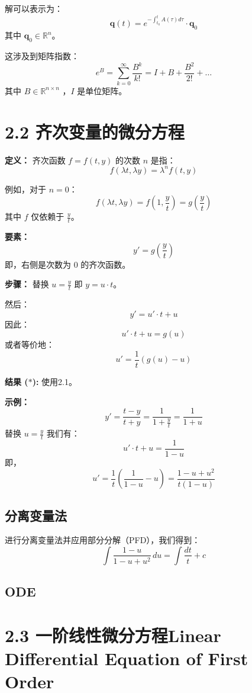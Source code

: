 \documentclass{ctexart}
\begin{document}
解可以表示为：
\[ \mathbf{q}(t) = e^{-\int_{t_0}^{t} A(\tau) d\tau} \cdot \mathbf{q}_0 \]
其中 \( \mathbf{q}_0 \in \mathbb{R}^n \)。

这涉及到矩阵指数：
\[ e^B = \sum_{k=0}^{\infty} \frac{B^k}{k!} = I + B + \frac{B^2}{2!} + \ldots \]
其中 \( B \in \mathbb{R}^{n \times n} \) ，\( I \) 是单位矩阵。


\section*{2.2 齐次变量的微分方程}

\textbf{定义：} 齐次函数 \( f = f(t,y) \) 的次数 \( n \) 是指：
\[ f(\lambda t, \lambda y) = \lambda^n f(t,y) \]

例如，对于 \( n = 0 \)：
\[ f(\lambda t, \lambda y) = f(1, \frac{y}{t}) = g(\frac{y}{t}) \]
其中 \( f \) 仅依赖于 \( \frac{y}{t} \)。

\textbf{要素：}
\[ y' = g\left(\frac{y}{t}\right) \]
即，右侧是次数为 0 的齐次函数。

\textbf{步骤：}
替换 \( u = \frac{y}{t} \) 即 \( y = u \cdot t \)。

然后：
\[ y' = u' \cdot t + u \]
因此：
\[ u' \cdot t + u = g(u) \]
或者等价地：
\[ u' = \frac{1}{t} (g(u) - u) \tag{*} \]

\textbf{结果 (\(*\)):} 使用2.1。

\textbf{示例：}
\[ y' = \frac{t - y}{t + y} = \frac{1}{1 + \frac{y}{t}} = \frac{1}{1 + u} \]
替换 \( u = \frac{y}{t} \) 我们有：
\[ u' \cdot t + u = \frac{1}{1 - u} \]
即，
\[ u' = \frac{1}{t} \left(\frac{1}{1 - u} - u\right) = \frac{1 - u + u^2}{t(1 - u)} \]


\subsection*{分离变量法}

进行分离变量法并应用部分分解（PFD），我们得到：
\[
\int \frac{1-u}{1-u+u^2} \, du = \int \frac{dt}{t} + c
\]


\newpage
\date{15.11.2023}
\subsection*{ODE}

\section*{2.3 一阶线性微分方程Linear Differential Equation of First Order}
\end{document}

